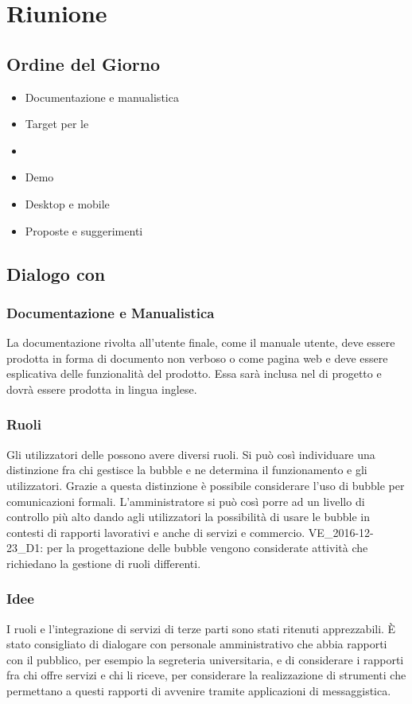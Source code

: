 \section{Riunione}
\subsection{Ordine del Giorno}
\begin{itemize}
	\item Documentazione e manualistica
	\item Target per le 
	\item {}
	\item Demo
	\item Desktop e mobile
	\item Proposte e suggerimenti
\end{itemize}

\subsection{Dialogo con \Proponente}
\subsubsection{Documentazione e Manualistica}
La documentazione rivolta all'utente finale, come il manuale utente, deve  essere prodotta in forma di documento non verboso o come pagina web e deve essere esplicativa delle funzionalità del prodotto. 
Essa sarà inclusa nel  di progetto e dovrà essere prodotta in lingua inglese.

\subsubsection{Ruoli}
Gli utilizzatori delle  possono avere diversi ruoli. Si può così individuare una distinzione fra chi gestisce la bubble e ne determina il funzionamento e gli utilizzatori.
Grazie a questa distinzione è possibile considerare l'uso di bubble per comunicazioni formali. 
L'amministratore si può così porre ad un livello di controllo più alto dando agli utilizzatori la possibilità di usare le bubble in contesti di rapporti lavorativi e anche di servizi e commercio.
VE_2016-12-23_D1: per la progettazione delle bubble vengono considerate attività che richiedano la gestione di ruoli differenti.

\subsubsection{Idee}
I ruoli e l'integrazione di servizi di terze parti sono stati ritenuti apprezzabili.
\`{E} stato consigliato di dialogare con personale amministrativo che abbia rapporti con il pubblico, per esempio la segreteria universitaria, e di considerare i rapporti fra chi offre servizi e chi li riceve, per considerare la realizzazione di strumenti che permettano a questi rapporti di avvenire tramite applicazioni di messaggistica.  

